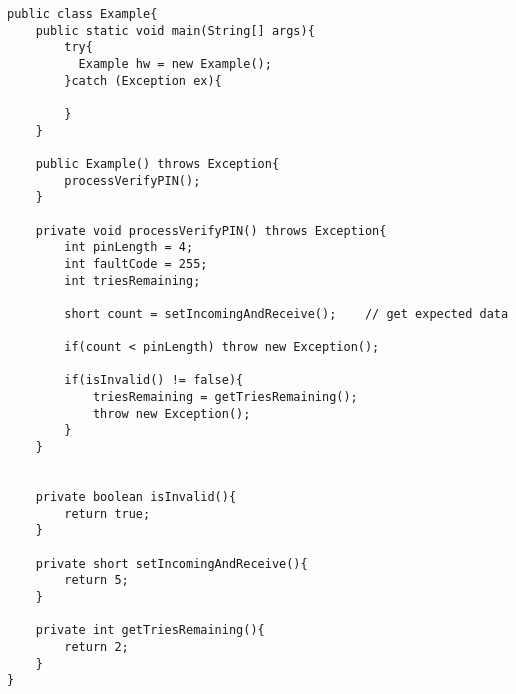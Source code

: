 \label{chap:samples}
\begin{lstlisting}[caption={Mocked Java example code from the Java Card samples},label={lst:example}]
public class Example{
    public static void main(String[] args){
        try{
		  Example hw = new Example();
        }catch (Exception ex){

        }
    }

    public Example() throws Exception{
        processVerifyPIN();
    }

    private void processVerifyPIN() throws Exception{
        int pinLength = 4;
        int faultCode = 255;
        int triesRemaining;

        short count = setIncomingAndReceive();    // get expected data

        if(count < pinLength) throw new Exception();

        if(isInvalid() != false){
            triesRemaining = getTriesRemaining();
            throw new Exception();
        }
    }


    private boolean isInvalid(){
        return true;
    }

    private short setIncomingAndReceive(){
        return 5;
    }

    private int getTriesRemaining(){
        return 2;
    }
}
\end{lstlisting}

\newpage

